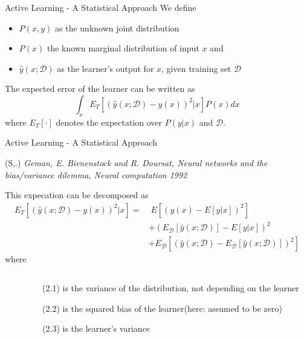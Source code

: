 \documentclass{beamer}
\newenvironment{reference}[2]{%
  \begin{textblock*}{\textwidth}(#1,#2)
      \footnotesize\it\bgroup\color{red!50!black}}{\egroup\end{textblock*}}
\newcommand{\D}{\mathcal{D}}
\newcommand{\ly}{\hat{y}(x;\D)}
\begin{document}
\begin{frame}{Active Learning - A Statistical Approach}
We define
\begin{itemize}
\item $P(x,y)$ as the unknown joint distribution
\item $P(x)$ the known marginal distribution of input $x$ and
\item $\ly$ as the learner's output for $x$, given training set $\D$
\end{itemize}
The expected error of the learner can be written as
\begin{equation}
    \int_x E_T \left[\left(\ly - y(x)\right)^2|x\right] P(x)dx
\end{equation}
where $E_T\left[ \cdot \right]$ denotes the expectation over $P(y|x)$ and $\D$.
\end{frame}

\begin{frame}{Active Learning - A Statistical Approach}
\begin{reference}{4mm}{85mm}
  S. Geman, E. Bienenstock and R. Doursat,
  Neural networks and the bias/variance dilemma, Neural computation 1992
\end{reference}

This expecation can be decomposed as
\small \begin{align}
    E_T \left[\left(\ly - y(x)\right)^2|x\right] =
    & \; E\left[\left(y(x) - E\left[y|x\right]\right)^2\right] \tag{2.1}\\
    & + \left( E_{\D} \left[\ly\right] - E\left[y|x\right]\right)^2 \tag{2.2}\\
    & + E_{\D} \left[\left(\ly - E_{\D} \left[\ly\right]\right)^2 \right] \tag{2.3}
\end{align}\normalsize
where
\begin{columns}[t]
\begin{column}{0.02\textwidth} \end{column} %
\begin{column}{0.98\textwidth}\begin{itemize}
  \item[{\small(2.1)}] is the variance of the distribution, not depending on the learner
  \item[{\small(2.2)}] is the squared bias of the learner(here: assumed to be zero)
  \item[{\small(2.3)}] is the learner's variance
\end{itemize}\end{column}
\end{columns}
\end{frame}
\end{document}
